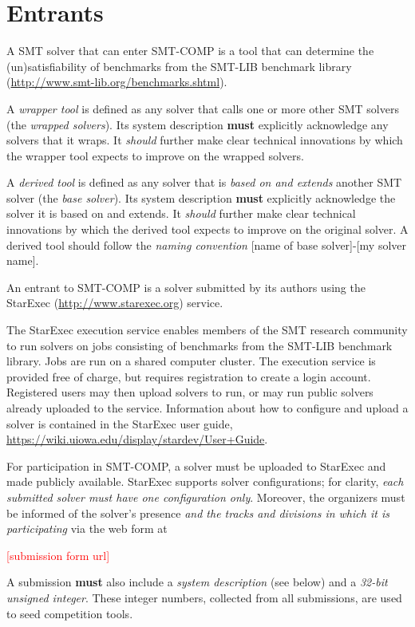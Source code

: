 \documentclass[12pt]{article}
\newcommand{\rem}[1]{\textcolor{red}{[#1]}}
\begin{document}

\section{Entrants}
\label{sec:entrants}

%
A SMT solver that can enter SMT-COMP is a tool that can
determine the (un)satisfiability of benchmarks from the SMT-LIB benchmark library
(\url{http://www.smt-lib.org/benchmarks.shtml}).

%
A \emph{wrapper tool} is defined as any solver that calls one or more other SMT
solvers (the \emph{wrapped solvers}). Its system description \textbf{must} explicitly acknowledge any
solvers that it wraps.  It \emph{should} further make clear technical
innovations by which the wrapper tool expects to improve on the wrapped
solvers.

%
A \emph{derived tool} is defined as any solver that is \emph{based on and
extends} another SMT solver (the \emph{base solver}).  Its system description
\textbf{must} explicitly acknowledge
the solver it is based on and extends.  It \emph{should} further make clear
technical innovations by which the derived tool expects to improve on the
original solver.  A derived tool should follow the \emph{naming convention}
{[name of base solver]-[my solver name]}.

%
An entrant to SMT-COMP is a solver submitted by its authors using
the StarExec (\url{http://www.starexec.org}) service.

%
The StarExec execution
service enables members of the SMT research community to run solvers
on jobs consisting of benchmarks from the SMT-LIB benchmark library.
Jobs are run on a shared computer cluster.  The execution service is
provided free of charge, but requires registration to create a
login account.  Registered users may then upload solvers to
run, or may run public solvers already uploaded to the service.
Information about how to configure and upload a solver is contained in
the StarExec user guide,
\url{https://wiki.uiowa.edu/display/stardev/User+Guide}.

%
For participation in SMT-COMP, a solver must be uploaded to StarExec
and made publicly available.  StarExec supports solver configurations;
for clarity, \emph{each submitted solver must have one configuration
  only}.  Moreover, the organizers must be informed of the solver's
presence \emph{and the tracks and divisions in which it is
  participating} via the web form at
\begin{center}
  \rem{submission form url}
\end{center}
A submission \textbf{must} also include a \emph{system description} (see below)
and a \emph{32-bit unsigned integer}.
 These integer numbers, collected from all submissions, are used to seed
 competition tools.
\end{document}
